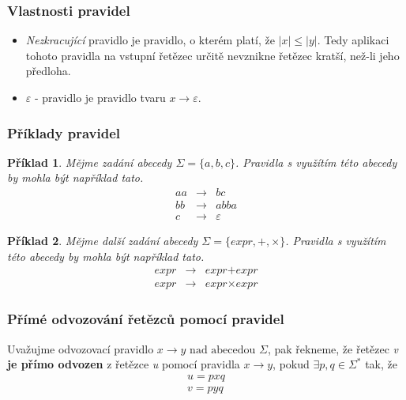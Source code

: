 \documentclass[10pt, a4paper, titlepage]{article}
\theoremstyle{note}
\newtheorem{priklad}{\textbf{Příklad}}
\begin{document}
\subsubsection{Vlastnosti pravidel}
\begin{itemize}
\item \emph{Nezkracující} pravidlo je pravidlo, o kterém platí, že $|x| \leq |y|$. Tedy aplikaci tohoto pravidla na vstupní řetězec určitě nevznikne řetězec kratší, než-li jeho předloha.

\item $\varepsilon$ - pravidlo je pravidlo tvaru $x \rightarrow \varepsilon$.
\end{itemize}

\subsubsection{Příklady pravidel}
\begin{priklad}
Mějme zadání abecedy $\Sigma = \lbrace a,b,c \rbrace$. Pravidla s využítím této abecedy by mohla být například tato.
\begin{eqnarray*}
aa &\rightarrow& bc \\
bb &\rightarrow& abba \\
c &\rightarrow& \varepsilon
\end{eqnarray*}
\end{priklad}

\begin{priklad}
Mějme další zadání abecedy $\Sigma = \lbrace expr, +, \times \rbrace$. Pravidla s využítím této abecedy by mohla být například tato.
\begin{eqnarray*}
\textit{expr} &\rightarrow& \textit{expr} + \textit{expr} \\
\textit{expr} &\rightarrow& \textit{expr} \times \textit{expr}
\end{eqnarray*}
\end{priklad}

\subsubsection{Přímé odvozování řetězců pomocí pravidel}
Uvažujme odvozovací pravidlo $ x \rightarrow y \text{ nad abecedou } \Sigma$, pak řekneme, že řetězec \emph{v} \textbf{je přímo odvozen}
z řetězce \emph{u} pomocí pravidla $ x \rightarrow y $, pokud $\exists p, q \in \Sigma^{*}$ tak, že
\begin{gather*}
u = p x q \\
v = p y q
\end{gather*}
\end{document}
